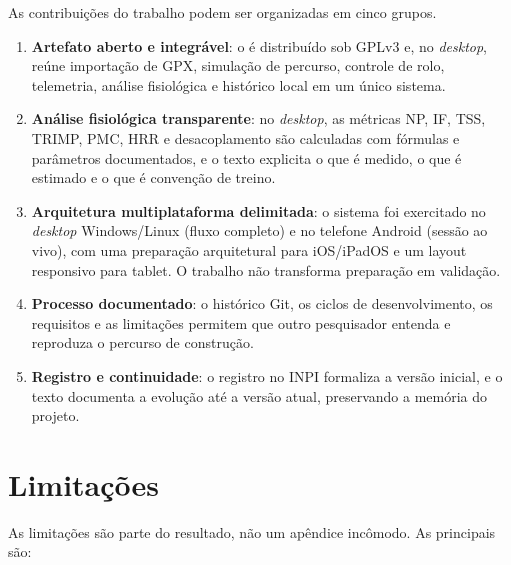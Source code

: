 As contribuições do trabalho podem ser organizadas em cinco grupos.

\begin{enumerate}
    \item \textbf{Artefato aberto e integrável}: o \argus{} é distribuído sob
        GPLv3 e, no \textit{desktop}, reúne importação de GPX, simulação de
        percurso, controle de rolo, telemetria, análise fisiológica e
        histórico local em um único sistema.

    \item \textbf{Análise fisiológica transparente}: no \textit{desktop}, as
        métricas NP, IF, TSS, TRIMP, PMC, HRR e desacoplamento são calculadas
        com fórmulas e parâmetros documentados, e o texto explicita o que é
        medido, o que é estimado e o que é convenção de treino.

    \item \textbf{Arquitetura multiplataforma delimitada}: o sistema foi
        exercitado no \textit{desktop} Windows/Linux (fluxo completo) e no
        telefone Android (sessão ao vivo), com uma preparação arquitetural para
        iOS/iPadOS e um layout responsivo para tablet. O trabalho não transforma
        preparação em validação.

    \item \textbf{Processo documentado}: o histórico Git, os ciclos de
        desenvolvimento, os requisitos e as limitações permitem que outro
        pesquisador entenda e reproduza o percurso de construção.

    \item \textbf{Registro e continuidade}: o registro no INPI formaliza a
        versão inicial, e o texto documenta a evolução até a versão atual,
        preservando a memória do projeto.
\end{enumerate}

\section{Limitações}
\label{sec:limitacoes-finais}

As limitações são parte do resultado, não um apêndice incômodo. As principais
são:

